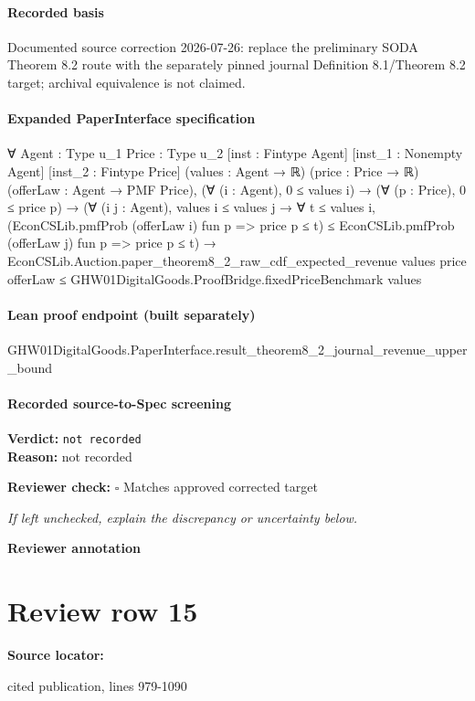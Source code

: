 \documentclass[10pt]{article}
\newcommand{\reviewerbox}{%
  \par\noindent\fbox{\parbox{0.96\linewidth}{\rule{0pt}{0.38in}}}\par
}
\newcommand{\reviewmatch}[1]{%
  \par\noindent\textbf{Reviewer check:} $\square$\; #1\par
  \noindent\emph{If left unchecked, explain the discrepancy or uncertainty below.}\par
}
\begin{document}
\paragraph{Recorded basis}
Documented source correction 2026-\allowbreak{}07-\allowbreak{}26:\allowbreak{} replace the preliminary SODA Theorem 8.\allowbreak{}2 route with the separately pinned journal Definition 8.\allowbreak{}1/\allowbreak{}Theorem 8.\allowbreak{}2 target;\allowbreak{} archival equivalence is not claimed.\allowbreak{}
\paragraph{Expanded PaperInterface specification}
\begin{ReviewVerbatim}
∀ {Agent : Type u_1} {Price : Type u_2} [inst : Fintype Agent] [inst_1 : Nonempty Agent] [inst_2 : Fintype Price]
  (values : Agent → ℝ) (price : Price → ℝ) (offerLaw : Agent → PMF Price),
  (∀ (i : Agent), 0 ≤ values i) →
    (∀ (p : Price), 0 ≤ price p) →
      (∀ (i j : Agent),
          values i ≤ values j →
            ∀ t ≤ values i,
              (EconCSLib.pmfProb (offerLaw i) fun p => price p ≤ t) ≤
                EconCSLib.pmfProb (offerLaw j) fun p => price p ≤ t) →
        EconCSLib.Auction.paper_theorem8_2_raw_cdf_expected_revenue values price offerLaw ≤
          GHW01DigitalGoods.ProofBridge.fixedPriceBenchmark values
\end{ReviewVerbatim}

\paragraph{Lean proof endpoint (built separately)}\begin{ReviewVerbatim}
GHW01DigitalGoods.PaperInterface.result_theorem8_2_journal_revenue_upper_bound
\end{ReviewVerbatim}

\paragraph{Recorded source-to-Spec screening}
\textbf{Verdict:} \texttt{not recorded}
\\
\textbf{Reason:} not recorded
\reviewmatch{Matches approved corrected target}
\noindent\textbf{Reviewer annotation}\par
\reviewerbox
\clearpage
\hypertarget{source-claim-2aeebcaf889368d8}{}
\section*{Review row 15}
\textbf{Source locator:} {\footnotesize\raggedright cited publication, lines 979-\allowbreak{}1090\par}
\end{document}
